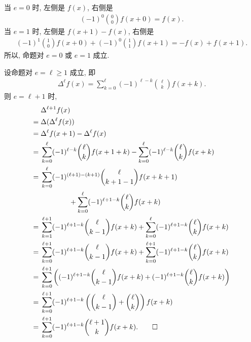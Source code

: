 \begin{pf}
    当 $e = 0$ 时, 左侧是 $f(x)$, 右侧是
    \begin{align*}
        (-1)^0 \binom{0}{0} f(x+0) = f(x).
    \end{align*}
    当 $e = 1$ 时, 左侧是 $f(x+1) - f(x)$, 右侧是
    \begin{align*}
        (-1)^1 \binom{1}{0} f(x+0) + (-1)^0 \binom{1}{1} f(x+1) = -f(x) + f(x+1).
    \end{align*}
    所以, 命题对 $e=0$ 或 $e=1$ 成立.

    设命题对 $e = \ell \geq 1$ 成立, 即
    \begin{align*}
        \Delta^{\ell} f(x) = \sum_{k = 0}^{\ell} (-1)^{\ell-k} \binom{\ell}{k} f(x+k).
    \end{align*}
    则 $e = \ell + 1$ 时,
    \begin{align*}
             & \Delta^{\ell + 1} f(x)                                                     \\
        = {} & \Delta (\Delta^{\ell} f(x))                                                \\
        = {} & \Delta^{\ell} f(x+1) - \Delta^{\ell} f(x)                                  \\
        = {} & \sum_{k = 0}^{\ell} (-1)^{\ell-k} \binom{\ell}{k} f(x+1+k)
        - \sum_{k = 0}^{\ell} (-1)^{\ell-k} \binom{\ell}{k} f(x+k)                        \\
        = {} & \sum_{k = 0}^{\ell} (-1)^{(\ell+1)-(k+1)} \binom{\ell}{k+1-1} f(x+k+1)     \\
             & \qquad \qquad + \sum_{k = 0}^{\ell} (-1)^{\ell+1-k} \binom{\ell}{k} f(x+k) \\
        = {} & \sum_{k = 1}^{\ell+1} (-1)^{\ell+1-k} \binom{\ell}{k-1} f(x+k)
        + \sum_{k = 0}^{\ell} (-1)^{\ell+1-k} \binom{\ell}{k} f(x+k)                      \\
        = {} & \sum_{k = 0}^{\ell+1} (-1)^{\ell+1-k} \binom{\ell}{k-1} f(x+k)
        + \sum_{k = 0}^{\ell+1} (-1)^{\ell+1-k} \binom{\ell}{k} f(x+k)                    \\
        = {} & \sum_{k = 0}^{\ell+1} \left( (-1)^{\ell+1-k} \binom{\ell}{k-1} f(x+k)
        + (-1)^{\ell+1-k} \binom{\ell}{k} f(x+k) \right)                                  \\
        = {} & \sum_{k = 0}^{\ell+1} (-1)^{\ell+1-k} \left( \binom{\ell}{k-1}
        + \binom{\ell}{k} \right) f(x+k)                                                  \\
        = {} & \sum_{k = 0}^{\ell+1} (-1)^{\ell+1-k} \binom{\ell+1}{k} f(x+k). \qedhere
    \end{align*}
\end{pf}

